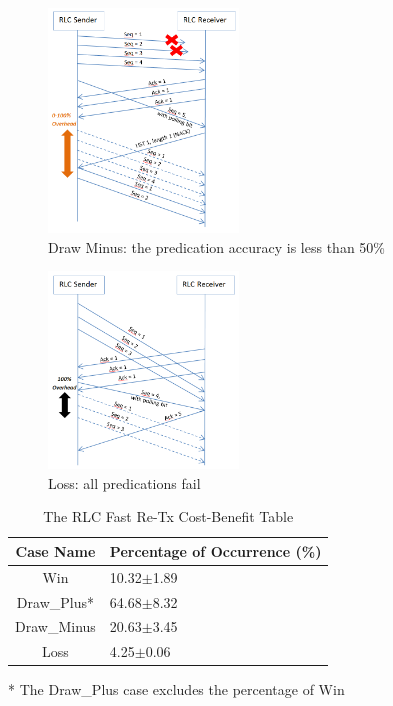 \begin{figure}
\centering
\includegraphics[width=0.45\textwidth]{figs/Draw.png}
\caption{Draw Minus: the predication accuracy is less than 50\%}
\label{fig:draw.minus}
\end{figure}

\begin{figure}
\centering
\includegraphics[width=0.45\textwidth]{figs/Loss.png}
\caption{Loss: all predications fail}
\label{fig:loss}
\end{figure}

\begin{table}
\begin{tabularx}{0.48\textwidth}{ | c | X |}
	\hline
	\textbf{Case Name} & \textbf{Percentage of Occurrence (\%)} \\
	\hline\hline
  	Win & 10.32$\pm$1.89 \\
  	\hline
  	Draw\_{Plus}* & 64.68$\pm$8.32 \\
  	\hline
  	Draw\_{Minus} & 20.63$\pm$3.45 \\
  	\hline
  	Loss & 4.25$\pm$0.06 \\
  	\hline
\end{tabularx}
* The Draw\_{Plus} case excludes the percentage of Win
\caption{The RLC Fast Re-Tx Cost-Benefit Table}
\label{tab:rlc.fast.sim}
\end{table}


\label{sec:eval}

